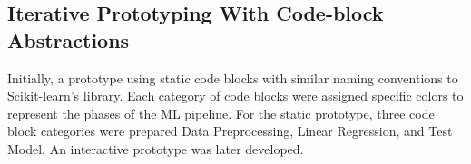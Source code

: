 \documentclass{sigchi-ext}
\begin{document}
\subsection{Iterative Prototyping With Code-block Abstractions}
Initially, a prototype using static code blocks with similar naming conventions to Scikit-learn's library. Each category of code blocks were assigned specific colors to represent the phases of the ML pipeline. For the static prototype, three code block categories were prepared \textemdash Data Preprocessing, Linear Regression, and Test Model. An interactive prototype was later developed.
\end{document}

